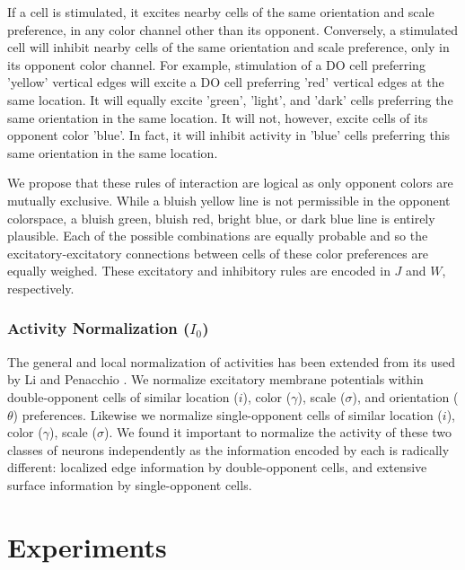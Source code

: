 \documentclass[journal,onecolumn]{IEEEtran}
\begin{document}
If a cell is stimulated, it excites nearby cells of the same orientation and scale preference, in any color channel other than its opponent. Conversely, a stimulated cell will inhibit nearby cells of the same orientation and scale preference, only in its opponent color channel. For example, stimulation of a DO cell preferring 'yellow' vertical edges will excite a DO cell preferring 'red' vertical edges at the same location. It will equally excite 'green', 'light', and 'dark' cells preferring the same orientation in the same location. It will not, however, excite cells of its opponent color 'blue'. In fact, it will inhibit activity in 'blue' cells preferring this same orientation in the same location.

We propose that these rules of interaction are logical as only opponent colors are mutually exclusive. While a bluish yellow line is not permissible in the opponent colorspace, a bluish green, bluish red, bright blue, or dark blue line is entirely plausible. Each of the possible combinations are equally probable and so the excitatory-excitatory connections between cells of these color preferences are equally weighed. These excitatory and inhibitory rules are encoded in $J$ and $W$, respectively.

\subsubsection*{Activity Normalization ($I_0$)}
The general and local normalization of activities \cite{heeger:1992} has been extended from its used by Li \cite{li:1999} and Penacchio \cite{penacchio:2013}. We normalize excitatory membrane potentials within double-opponent cells of similar location ($i$), color ($\gamma$), scale ($\sigma$), and orientation ($\theta$) preferences. Likewise we normalize single-opponent cells of similar location ($i$), color ($\gamma$), scale ($\sigma$). We found it important to normalize the activity of these two classes of neurons independently as the information encoded by each is radically different: localized edge information by double-opponent cells, and extensive surface information by single-opponent cells.


%
%
%
\section{Experiments}
\end{document}
